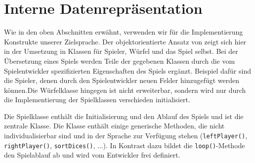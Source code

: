\section{Interne Datenrepräsentation} %
\label{sec:interne_datenreprasentation}
    Wie in den oben Abschnitten erwähnt, verwenden wir für die Implementierung Konstrukte unserer Zielsprache. Der objektorientierte Ansatz von \dg zeigt sich hier in der Umsetzung in Klassen für Spieler, Würfel und das Spiel selbst. Bei der Übersetzung eines Spiels werden Teile der gegebenen Klassen durch die vom Spielentwickler spezifizierten Eigenschaften des Spiels ergänzt. Beispiel dafür sind die Spieler, denen durch den Spielentwickler neuen Felder hinzugefügt werden können.Die Würfelklasse hingegen ist nicht erweiterbar, sondern wird nur durch die Implementierung der Spielklassen verschieden initialisiert.
    
    Die Spielklasse enthält die Initialisierung und den Ablauf des Spiels und ist die zentrale Klasse. Die Klasse enthält einige generische Methoden, die nicht individualisierbar sind und in der Sprache zur Verfügung stehen (\texttt{leftPlayer()}, \texttt{rightPlayer()}, \texttt{sortDices()}, ...). In Kontrast dazu bildet die \texttt{loop()}-Methode den Spielablauf ab und wird vom Entwickler frei definiert.
    















